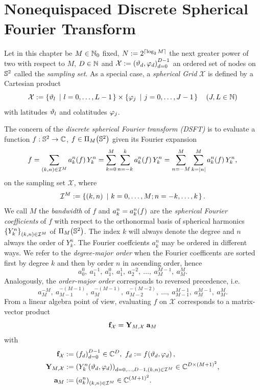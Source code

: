 \chapter{Nonequispaced Discrete Spherical Fourier Transform}
\label{DSFT}
Let in this chapter be $M \in \mathbb{N}_{0}$ fixed, $N := 2^{\left\lceil\log_2 M\right\rceil}$ the 
next greater power of two with respect to $M$, $D \in \mathbb{N}$ and $\mathcal{X} := \left(\vartheta_d,\varphi_d\right)_{d=0}^{D-1}$ 
an ordered set of nodes on $\mathbb{S}^2$ called the \emph{sampling set}. As a special case, a \emph{spherical Grid} 
$\mathcal{X}$ is defined by a Cartesian product 
$$
  \mathcal{X} := \left\{\vartheta_{l}\ \left|\ l=0,\ldots,L-1\right.\right\rbrace \times \left\{\varphi_{j}\ \left|\ j=0,\ldots,J-1\right.\right\rbrace \quad \left(J,L \in \mathbb{N}\right)
$$
with latitudes $\vartheta_{l}$ and colatitudes $\varphi_{j}$.

The concern of the \emph{discrete spherical Fourier transform (DSFT)} 
is to evaluate a function $f: \mathbb{S}^2 \rightarrow \mathbb{C}$, $f \in \Pi_{M}{\hspace{-0.4ex}}\left(\mathbb{S}^2\right)$ given its Fourier expansion
\begin{equation}
  \label{NFSFT:FourierExpansion} 
  f = \sum_{\left(k,n\right) \in\mathcal{I}^M} a_k^n{\hspace{-0.4ex}}\left(f\right) Y_{k}^n = \sum_{k=0}^M \sum_{n=-k}^k a_k^n{\hspace{-0.4ex}}\left(f\right) Y_{k}^n = \sum_{n=-M}^M \sum_{k=\left\vert n\right\vert}^M a_k^n{\hspace{-0.4ex}}\left(f\right) Y_{k}^n,
\end{equation}  
on the sampling set $\mathcal{X}$, where $$\mathcal{I}^M := \left\{\left(k,n\right)\ \left|\ k=0,\ldots,M;n=-k,\ldots,k\right.\right\rbrace.$$
We call $M$ the \emph{bandwidth} of $f$ and $a_{k}^n = a_k^n{\hspace{-0.4ex}}\left(f\right)$ are the \emph{spherical Fourier coefficients} of $f$ with respect to the 
orthonormal basis of spherical harmonics $\left\{Y_{k}^n\right\rbrace_{\left(k,n\right) \in\mathcal{I}^M}$ of $\Pi_{M}{\hspace{-0.4ex}}\left(\mathbb{S}^2\right)$. The index $k$ will always denote the degree and $n$ always the order of $Y_{k}^n$. The Fourier coeffcients $a_{k}^n$ may be ordered 
in different ways. We refer to the \emph{degree-major order} when the Fourier coefficents are sorted first by degree $k$ and then by order $n$ in ascending order, hence
$$ a_{0}^0,\: a_{1}^{-1},\: a_{1}^{0},\: a_{1}^{1},\: a_{2}^{-2},\: \ldots,\: a_{M}^{M-1},\: a_{M}^{M}.$$ 
Analogously, the \emph{order-major order} corresponds to reversed precedence, i.e.
$$ a_{M}^{-M},\: a_{M-1}^{-(M-1)},\: a_{M}^{-(M-1)},\: a_{M-2}^{-(M-2)},\: \ldots,\: a_{M-1}^{M-1},\: a_{M}^{M-1},\: a_{M}^{M}.$$ 
From a linear algebra point of view, evaluating $f$ on $\mathcal{X}$ corresponds to a matrix-vector product
$$ \mathbf{f}_{\mathcal{X}} = \mathbf{Y}_{M,\mathcal{X}} \; \mathbf{a}_{M}$$
with
\begin{equation}
  \nonumber
  \begin{split}
    \V{f}_{\mathcal{X}} & := \paren{f_d}_{d=0}^{D-1} \in \C^{D},\ f_{d} := \fun{f}{\vtheta_{d},\vphi_{d}},\\
    \V{Y}_{M,\mathcal{X}} & := \paren{\fun{Y_k^n}{\vtheta_d,\vphi_d}}_{d=0,\ldots,D-1, \paren{k,n} \in \mathcal{I}^M} \in \C^{D \times \paren{M+1}^2},\\
    \V{a}_{M} & := \paren{a_k^n}_{\paren{k,n} \in \mathcal{I}^M} \in \C^{\paren{M+1}^2}.
  \end{split}
\end{equation}
